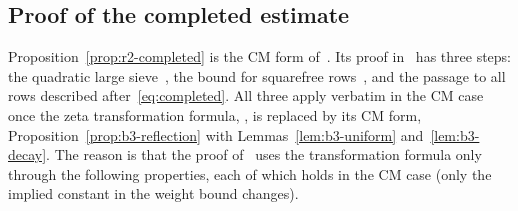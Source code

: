 \documentclass[11pt]{article}
\numberwithin{equation}{section}
\begin{document}
\subsection{Proof of the completed estimate}\label{subsec:b4-completed}

Proposition~\ref{prop:r2-completed} is the CM form of~\cite[Proposition~5.2]{OAI1112}. Its proof
in~\cite[Section~6]{OAI1112} has three steps: the quadratic large sieve~\cite[Lemma~6.5]{OAI1112},
the bound for squarefree rows~\cite[Lemma~6.6]{OAI1112}, and the passage to all rows described
after~\eqref{eq:completed}. All three apply verbatim in the CM case once the zeta transformation
formula, \cite[Proposition~6.2 and Lemmas~6.3 and~6.4]{OAI1112}, is replaced by its CM form,
Proposition~\ref{prop:b3-reflection} with Lemmas~\ref{lem:b3-uniform} and~\ref{lem:b3-decay}. The
reason is that the proof of~\cite[Lemma~6.6]{OAI1112} uses the transformation formula only through
the following properties, each of which holds in the CM case (only the implied constant in the weight
bound changes).
\end{document}
